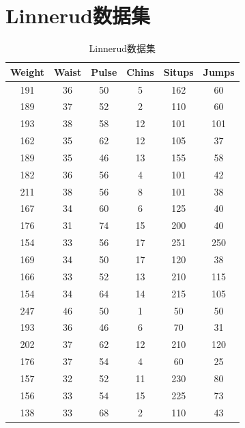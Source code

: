 \documentclass[a4paper,12pt]{article}
\begin{document}
\section{Linnerud数据集}
\begin{table}[!h]
	\centering
	\caption{Linnerud数据集}
	\setlength{\tabcolsep}{6mm}
	\begin{tabular}{cccccc}
		\toprule
		\textbf{Weight} & \textbf{Waist} & \textbf{Pulse} & \textbf{Chins} & \textbf{Situps} & \textbf{Jumps} \\
		\midrule
		191   & 36    & 50    & 5     & 162   & 60 \\
		189   & 37    & 52    & 2     & 110   & 60 \\
		193   & 38    & 58    & 12    & 101   & 101 \\
		162   & 35    & 62    & 12    & 105   & 37 \\
		189   & 35    & 46    & 13    & 155   & 58 \\
		182   & 36    & 56    & 4     & 101   & 42 \\
		211   & 38    & 56    & 8     & 101   & 38 \\
		167   & 34    & 60    & 6     & 125   & 40 \\
		176   & 31    & 74    & 15    & 200   & 40 \\
		154   & 33    & 56    & 17    & 251   & 250 \\
		169   & 34    & 50    & 17    & 120   & 38 \\
		166   & 33    & 52    & 13    & 210   & 115 \\
		154   & 34    & 64    & 14    & 215   & 105 \\
		247   & 46    & 50    & 1     & 50    & 50 \\
		193   & 36    & 46    & 6     & 70    & 31 \\
		202   & 37    & 62    & 12    & 210   & 120 \\
		176   & 37    & 54    & 4     & 60    & 25 \\
		157   & 32    & 52    & 11    & 230   & 80 \\
		156   & 33    & 54    & 15    & 225   & 73 \\
		138   & 33    & 68    & 2     & 110   & 43 \\
		\bottomrule
	\end{tabular}%
	\label{tab:addlabel}%
\end{table}%
\end{document}
